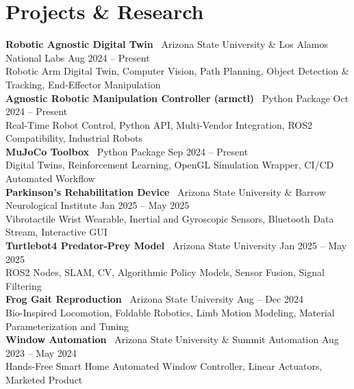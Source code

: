 \documentclass[10pt]{article}
\begin{document}
\section*{Projects \& Research}
\textbf{Robotic Agnostic Digital Twin} \textbar\ Arizona State University \& Los Alamos National Labs  \hfill Aug 2024 -- Present \\
\hspace*{2em}Robotic Arm Digital Twin, Computer Vision, Path Planning, Object Detection \& Tracking, End-Effector Manipulation
\\
\textbf{Agnostic Robotic Manipulation Controller (armctl)} \textbar\ Python Package \hfill Oct 2024 -- Present \\
\hspace*{2em}Real-Time Robot Control, Python API, Multi-Vendor Integration, ROS2 Compatibility, Industrial Robots
\\
\textbf{MuJoCo Toolbox} \textbar\ Python Package \hfill Sep 2024 -- Present \\
\hspace*{2em}Digital Twins, Reinforcement Learning, OpenGL Simulation Wrapper, CI/CD Automated Workflow
\\
\textbf{Parkinson's Rehabilitation Device} \textbar\ Arizona State University \& Barrow Neurological Institute \hfill Jan 2025 -- May 2025 \\
\hspace*{2em}Vibrotactile Wrist Wearable, Inertial and Gyroscopic Sensors, Bluetooth Data Stream, Interactive GUI
\\
\textbf{Turtlebot4 Predator-Prey Model} \textbar\ Arizona State University \hfill Jan 2025 -- May 2025 \\
\hspace*{2em}ROS2 Nodes, SLAM, CV, Algorithmic Policy Models, Sensor Fusion, Signal Filtering
\\
\textbf{Frog Gait Reproduction} \textbar\ Arizona State University \hfill Aug -- Dec 2024 \\
\hspace*{2em}Bio-Inspired Locomotion, Foldable Robotics, Limb Motion Modeling, Material Parameterization and Tuning
\\
\textbf{Window Automation} \textbar\ Arizona State University \& Summit Automation \hfill Aug 2023 -- May 2024 \\
\hspace*{2em}Hands-Free Smart Home Automated Window Controller, Linear Actuators, Marketed Product
\\
\end{document}
